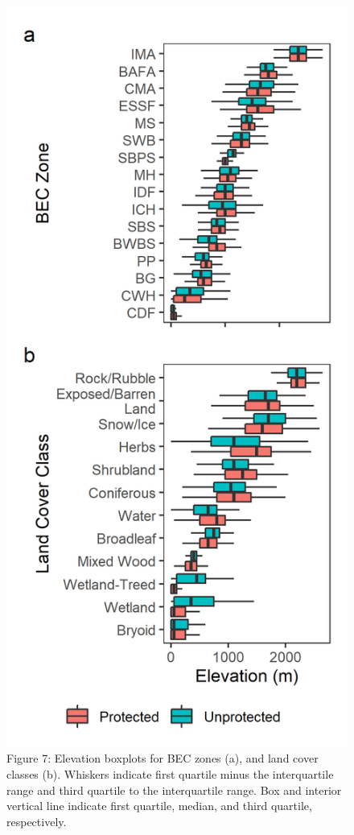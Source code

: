 \documentclass[10pt,oneside]{article}
\makeatletter
\def\maxwidth{\ifdim\Gin@nat@width>\linewidth\linewidth
\else\Gin@nat@width\fi}
\let\Oldincludegraphics\includegraphics
\renewcommand{\includegraphics}[1]{\Oldincludegraphics[width=\maxwidth]{#1}}
\makeatother
\begin{document}
\begin{figure}
\hypertarget{fig:elev-boxplots}{%
\centering
\includegraphics{figures/elev_boxplots.png}
\caption{Figure 7: Elevation boxplots for BEC zones (a), and land cover
classes (b). Whiskers indicate first quartile minus the interquartile
range and third quartile to the interquartile range. Box and interior
vertical line indicate first quartile, median, and third quartile,
respectively.}\label{fig:elev-boxplots}
}
\end{figure}
\end{document}
